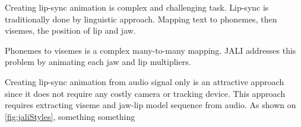 \documentclass[10pt,twocolumn,letterpaper]{article}
\begin{document}
Creating lip-sync animation is complex and challenging task. Lip-sync is traditionally done by linguistic approach. Mapping text to phonemes, then visemes, the position of lip and jaw\cite{ezzatMikeTalkTalkingFacial1998}.

Phonemes to visemes is a complex many-to-many mapping. JALI addresses this problem by animating each jaw and lip multipliers.

Creating lip-sync animation from audio signal only is an attractive approach since it does not require any costly camera or tracking device. This approach requires extracting viseme and jaw-lip model sequence from audio.
As shown on \cref{fig:jaliStyles}, something something










{\small



}
\end{document}
